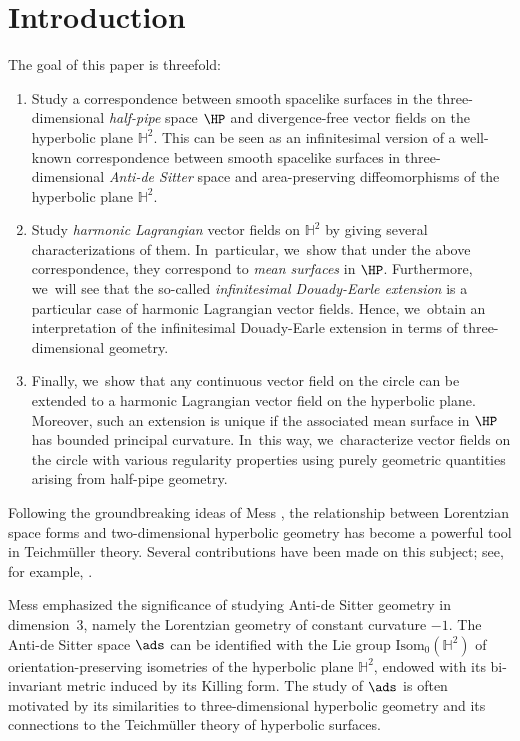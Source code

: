 \section{Introduction}
The goal of this paper is threefold:
\begin{enumerate}
\item Study a correspondence between smooth spacelike surfaces in the three-dimensional \emph{half-pipe} space $\HP$ and divergence-free vector fields on the hyperbolic plane $\mathbb{H}^2$. This can be seen as an infinitesimal version of a well-known correspondence between smooth spacelike surfaces in three-dimensional \emph{Anti-de Sitter} space and area-preserving diffeomorphisms of the hyperbolic plane $\mathbb{H}^2$.
\item Study \emph{harmonic Lagrangian} vector fields on $\mathbb{H}^2$ by giving several characterizations of them. In~particular, we~show that under the above correspondence, they correspond to \emph{mean surfaces} in $\HP$. Furthermore, we~will see that the so-called \emph{infinitesimal Douady-Earle extension} is a particular case of harmonic Lagrangian vector fields. Hence, we~obtain an interpretation of the infinitesimal Douady-Earle extension in terms of three-dimensional geometry.
\item Finally, we~show that any continuous vector field on the circle can be extended to a harmonic Lagrangian vector field on the hyperbolic plane. Moreover, such an extension is unique if the associated mean surface in \(\HP\) has bounded principal curvature. In~this way, we~characterize vector fields on the circle with various regularity properties using purely geometric quantities arising from half-pipe geometry.
\end{enumerate}

Following the groundbreaking ideas of Mess \cite{Mess}, the relationship between Lorentzian space forms and two-dimensional hyperbolic geometry has become a powerful tool in Teichmüller theory. Several contributions have been made on this subject; see, for example, \cite{Note_on_paper_mess,flatspacetimes_bonsante,Barbot_flatspacetime,canorot,BS_flat_conical}.

Mess emphasized the significance of studying Anti-de Sitter geometry in dimension~$3$, namely the Lorentzian geometry of constant curvature $-1$. The Anti-de Sitter space $\ads$ can be identified with the Lie group \(\text{Isom}_0(\mathbb{H}^2)\) of orientation-preserving isometries of the hyperbolic plane \(\mathbb{H}^2\), endowed with its bi-invariant metric induced by its Killing form. The study of $\ads$ is often motivated by its similarities to three-dimensional hyperbolic geometry and its connections to the Teichmüller theory of hyperbolic surfaces.

